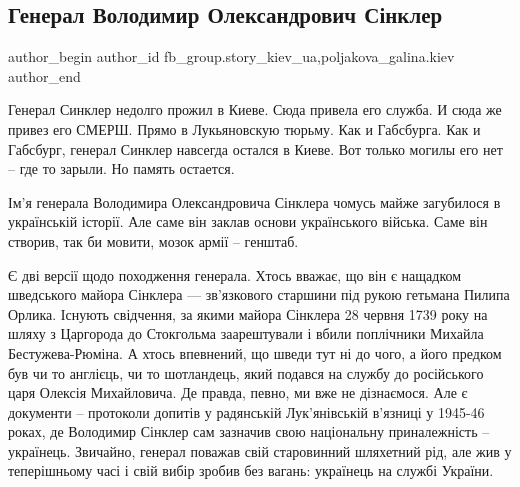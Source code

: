  
 
 
 
 
 
\subsection{Генерал Володимир Олександрович Сінклер}
\label{sec:23_12_2021.fb.fb_group.story_kiev_ua.2.general_sinkler}
 
\ifcmt
 author_begin
   author_id fb_group.story_kiev_ua,poljakova_galina.kiev
 author_end
\fi

Генерал Синклер недолго прожил в Киеве. Сюда привела его служба. И сюда же
привез его СМЕРШ. Прямо в Лукьяновскую тюрьму. Как и Габсбурга. Как и Габсбург,
генерал Синклер навсегда остался в Киеве. Вот только могилы его нет – где то
зарыли. Но память остается. 


Ім’я генерала Володимира Олександровича Сінклера чомусь майже загубилося в
українській історії. Але саме він заклав основи українського війська. Саме він
створив, так би мовити, мозок армії – генштаб. 

Є дві версії щодо походження генерала. Хтось вважає, що він є нащадком
шведського майора Сінклера — зв'язкового старшини під рукою гетьмана Пилипа
Орлика. Існують свідчення, за якими майора Сінклера 28 червня 1739 року на
шляху з Царгорода до Стокгольма заарештували і вбили поплічники Михайла
Бестужева-Рюміна. А хтось впевнений, що шведи тут ні до чого, а його предком
був чи то англієць, чи то шотландець, який подався на службу до російського
царя Олексія Михайловича. Де правда, певно, ми вже не дізнаємося. Але є
документи – протоколи допитів у радянській Лук’янівській в’язниці у 1945-46
роках, де Володимир Сінклер сам зазначив свою національну приналежність –
українець. Звичайно, генерал поважав свій старовинний шляхетний рід, але жив у
теперішньому часі і свій вибір зробив без вагань: українець на службі України.

